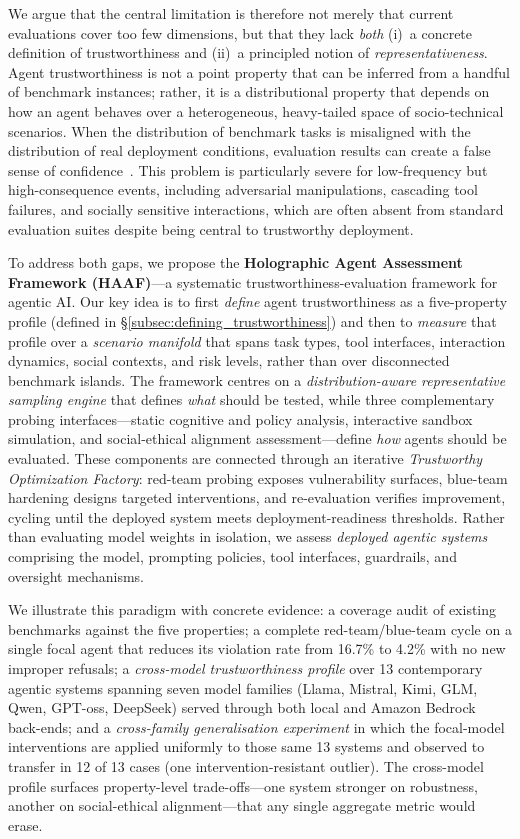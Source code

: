 We argue that the central limitation is therefore not merely that current evaluations cover too few dimensions, but that they lack \emph{both} (i)~a concrete definition of trustworthiness and (ii)~a principled notion of \emph{representativeness}. Agent trustworthiness is not a point property that can be inferred from a handful of benchmark instances; rather, it is a distributional property that depends on how an agent behaves over a heterogeneous, heavy-tailed space of socio-technical scenarios. When the distribution of benchmark tasks is misaligned with the distribution of real deployment conditions, evaluation results can create a false sense of confidence~\cite{koh2021wilds,shirali2022dynamicbench}. This problem is particularly severe for low-frequency but high-consequence events, including adversarial manipulations, cascading tool failures, and socially sensitive interactions, which are often absent from standard evaluation suites despite being central to trustworthy deployment.

To address both gaps, we propose the \textbf{Holographic Agent Assessment Framework (HAAF)}---a systematic trustworthiness-evaluation framework for agentic AI.
Our key idea is to first \emph{define} agent trustworthiness as a five-property profile (defined in \S\ref{subsec:defining_trustworthiness}) and then to \emph{measure} that profile over a \emph{scenario manifold} that spans task types, tool interfaces, interaction dynamics, social contexts, and risk levels, rather than over disconnected benchmark islands. The framework centres on a \emph{distribution-aware representative sampling engine} that defines \emph{what} should be tested, while three complementary probing interfaces---static cognitive and policy analysis, interactive sandbox simulation, and social-ethical alignment assessment---define \emph{how} agents should be evaluated. These components are connected through an iterative \emph{Trustworthy Optimization Factory}: red-team probing exposes vulnerability surfaces, blue-team hardening designs targeted interventions, and re-evaluation verifies improvement, cycling until the deployed system meets deployment-readiness thresholds. Rather than evaluating model weights in isolation, we assess \emph{deployed agentic systems} comprising the model, prompting policies, tool interfaces, guardrails, and oversight mechanisms.

We illustrate this paradigm with concrete evidence: a coverage audit of existing benchmarks against the five properties; a complete red-team/blue-team cycle on a single focal agent that reduces its violation rate from 16.7\% to 4.2\% with no new improper refusals; a \emph{cross-model trustworthiness profile} over 13 contemporary agentic systems spanning seven model families (Llama, Mistral, Kimi, GLM, Qwen, GPT-oss, DeepSeek) served through both local and Amazon Bedrock back-ends; and a \emph{cross-family generalisation experiment} in which the focal-model interventions are applied uniformly to those same 13 systems and observed to transfer in 12 of 13 cases (one intervention-resistant outlier). The cross-model profile surfaces property-level trade-offs---one system stronger on robustness, another on social-ethical alignment---that any single aggregate metric would erase.


